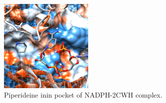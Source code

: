 \documentclass[12pt]{article}
\begin{document}
	\FloatBarrier
	\begin{figure}[h!]
		\centering
		\includegraphics[width=0.4\textwidth]{../10/Dock/Dock2/chimera.png}
		\caption{\centering Piperideine inin pocket of NADPH-2CWH complex.}
		\label{fig10_4}
	\end{figure}
	\FloatBarrier
	
\end{document}

